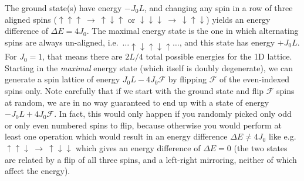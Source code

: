 \documentclass[a4paper, twocolumn]{article}
\begin{document}
The ground state(s) have energy $-J_0L$, and changing any spin in a row of three aligned spins ($\uparrow\uparrow\uparrow\ \rightarrow \ \uparrow\downarrow\uparrow$ or $\downarrow\downarrow\downarrow\ \rightarrow\ \downarrow\uparrow\downarrow$) yields an energy difference of $\Delta E=4J_0$. The maximal energy state is the one in which alternating spins are always un-aligned, i.e.\ $\dots\uparrow\downarrow\uparrow\downarrow\uparrow\dots$, and this state has energy $+J_0L$. For $J_0=1$, that means there are $2L/4$ total possible energies for the 1D lattice. Starting in the \textit{maximal} energy state (which itself is doubly degenerate), we can generate a spin lattice of energy $J_0L-4J_0\mathcal{F}$ by flipping $\mathcal{F}$ of the even-indexed spins only. Note carefully that if we start with the ground state and flip $\mathcal{F}$ spins at random, we are in no way guaranteed to end up with a state of energy $-J_0L+4J_0\mathcal{F}$. In fact, this would only happen if you randomly picked only odd or only even numbered spins to flip, because otherwise you would perform at least one operation which would result in an energy difference $\Delta E\not=4J_0$ like e.g.\ $\uparrow\uparrow\downarrow\ \rightarrow \ \uparrow\downarrow\downarrow$ which gives an energy difference of $\Delta E=0$ (the two states are related by a flip of all three spins, and a left-right mirroring, neither of which affect the energy).
\end{document}
